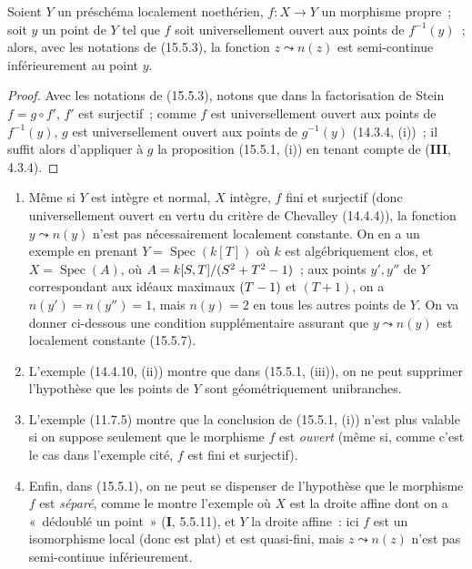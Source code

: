 \begin{corollary}[15.5.4]
\label{IV.15.5.4-fr}
Soient $Y$ un préschéma localement noethérien, $f:X\to Y$ un morphisme propre~; soit $y$ un point de $Y$ tel que $f$ soit universellement ouvert aux points de $f^{-1}(y)$~;
alors, avec les notations de \textup{(15.5.3)}, la fonction $z\leadsto n(z)$ est semi-continue inférieurement au point $y$.
\end{corollary}

\begin{proof}
Avec les notations de (15.5.3), notons que dans la factorisation de Stein $f=g\circ f'$, $f'$ est surjectif~; comme $f$ est universellement ouvert aux points de $f^{-1}(y)$, $g$ est universellement ouvert aux points de $g^{-1}(y)$ (14.3.4, (i))~; il suffit alors d'appliquer à $g$ la proposition (15.5.1, (i)) en tenant compte de (\textbf{III}, 4.3.4).
\end{proof}

\begin{remarks}[15.5.5]
\label{IV.15.5.5-fr}
\begin{enumerate}[label=\emph{(\roman*)}]
  \item Même si $Y$ est intègre et normal, $X$ intègre, $f$ fini et surjectif (donc universellement ouvert en vertu du critère de Chevalley (14.4.4)), la fonction $y\leadsto n(y)$ n'est pas nécessairement localement constante. On en a un exemple en prenant $Y=\operatorname{Spec}(k[T])$ où $k$ est algébriquement clos, et $X=\operatorname{Spec}(A)$, où $A=k[S,T]/(S^2+T^2- 1)$~; aux points $y',y''$ de $Y$ correspondant aux idéaux maximaux $(T- 1)$ et $(T+1)$, on a $n(y')=n(y'')=1$, mais $n(y)=2$ en tous les autres points de $Y$. On va donner ci-dessous une condition supplémentaire assurant que $y\leadsto n(y)$ est localement constante (15.5.7).
  \item L'exemple (14.4.10, (ii)) montre que dans (15.5.1, (iii)), on ne peut supprimer l'hypothèse que les points de $Y$ sont géométriquement unibranches.
  \item L'exemple (11.7.5) montre que la conclusion de (15.5.1, (i)) n'est plus valable si on suppose seulement que le morphisme $f$ est \emph{ouvert} (même si, comme c'est le cas dans l'exemple cité, $f$ est fini et surjectif).
  \item Enfin, dans (15.5.1), on ne peut se dispenser de l'hypothèse que le morphisme $f$ est \emph{séparé}, comme le montre l'exemple où $X$ est la droite affine dont on a «~dédoublé un point~» (\textbf{I}, 5.5.11), et $Y$ la droite affine~: ici $f$ est un isomorphisme local (donc est plat) et est quasi-fini, mais $z\leadsto n(z)$ n'est pas semi-continue inférieurement.
\end{enumerate}
\end{remarks}

